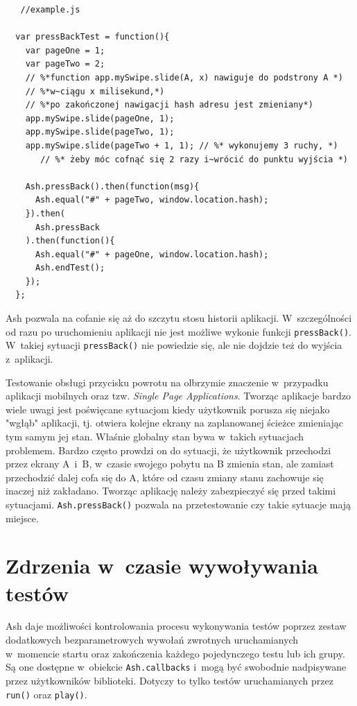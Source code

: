 \documentclass[brudnopis]{xmgr}
\begin{document}
\begin{lstlisting}
   //example.js

  var pressBackTest = function(){
    var pageOne = 1;
    var pageTwo = 2;
    // %*function app.mySwipe.slide(A, x) nawiguje do podstrony A *)
    // %*w~ciągu x milisekund,*)
    // %*po zakończonej nawigacji hash adresu jest zmieniany*)
    app.mySwipe.slide(pageOne, 1); 
    app.mySwipe.slide(pageTwo, 1); 
    app.mySwipe.slide(pageTwo + 1, 1); // %* wykonujemy 3 ruchy, *)
       // %* żeby móc cofnąć się 2 razy i~wrócić do punktu wyjścia *)
    
    Ash.pressBack().then(function(msg){
      Ash.equal("#" + pageTwo, window.location.hash);
    }).then(
      Ash.pressBack
    ).then(function(){
      Ash.equal("#" + pageOne, window.location.hash);
      Ash.endTest();
    });
  };
\end{lstlisting}

Ash pozwala na cofanie się aż do szczytu stosu historii aplikacji. W~szczególności od razu po uruchomieniu aplikacji nie jest możliwe wykonie funkcji \texttt{pressBack()}. W~takiej sytuacji \texttt{pressBack()} nie powiedzie się, ale nie dojdzie też do wyjścia z~aplikacji.

Testowanie obsługi przycisku powrotu na olbrzymie znaczenie w~przypadku aplikacji mobilnych oraz tzw. \textit{Single Page Applications}. Tworząc aplikacje bardzo wiele uwagi jest poświęcane sytuacjom kiedy użytkownik porusza się niejako "wgłąb" aplikacji, tj. otwiera kolejne ekrany na zaplanowanej ścieżce zmieniając tym samym jej stan.  Właśnie globalny stan bywa w~takich sytuacjach problemem. Bardzo często prowdzi on do sytuacji, że użytkownik przechodzi przez ekrany A~i~B, w~czasie swojego pobytu na B zmienia stan, ale zamiast przechodzić dalej cofa się do A, które od czasu zmiany stanu zachowuje się inaczej niż zakładano. Tworząc aplikację należy zabezpieczyć się przed takimi sytuacjami. \texttt{Ash.pressBack()} pozwala na przetestowanie czy takie sytuacje mają miejsce. 

\section{Zdrzenia w~czasie wywoływania testów}

Ash daje możliwości kontrolowania procesu wykonywania testów poprzez zestaw dodatkowych bezparametrowych wywołań zwrotnych uruchamianych w~momencie startu oraz zakończenia każdego pojedynczego testu lub ich grupy. Są one dostępne w~obiekcie \texttt{Ash.callbacks} i~mogą być swobodnie nadpisywane przez użytkowników biblioteki. Dotyczy to tylko testów uruchamianych przez \texttt{run()} oraz \texttt{play()}.
\end{document}

